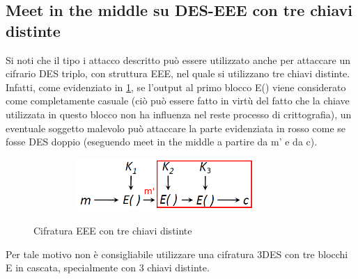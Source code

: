 \subsection{Meet in the middle su DES-EEE con tre chiavi distinte}
Si noti che il tipo i attacco descritto può essere utilizzato anche per attaccare un cifrario DES triplo, con struttura EEE, nel quale si utilizzano tre chiavi distinte. Infatti, come evidenziato in \ref{fig:EEE}, se l'output al primo blocco E() viene considerato come completamente casuale (ciò può essere fatto in virtù del fatto che la chiave utilizzata in questo blocco non ha influenza nel reste processo di crittografia), un eventuale soggetto malevolo può attaccare la parte evidenziata in rosso come se fosse DES doppio (eseguendo meet in the middle a partire da m' e da c).
\begin{figure}[htbp]
	\centering%
	\subfigure%
	{\includegraphics[height=2cm, width=10cm, keepaspectratio]{Immagini/modalita_operative/EEE.png}}
	\caption{Cifratura EEE con tre chiavi distinte \label{fig:EEE}} 	
\end{figure}
Per tale motivo non è consigliabile utilizzare una cifratura 3DES con tre blocchi E in cascata, specialmente con 3 chiavi distinte.